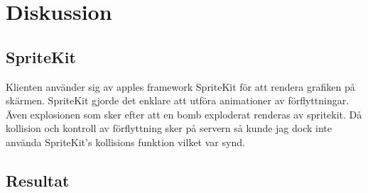 \documentclass[10pt, titlepage, oneside, a4paper]{article}
\begin{document}
    \section{Diskussion}
    	\subsection{SpriteKit}
    	
    	Klienten använder sig av apples framework SpriteKit för att rendera grafiken på skärmen. SpriteKit gjorde det enklare att utföra animationer av förflyttningar. Även explosionen som sker efter att en bomb exploderat renderas av spritekit. Då kollision och kontroll av förflyttning sker på servern så kunde jag dock inte använda SpriteKit's kollisions funktion vilket var synd. 
    	

    	
    	
    	
    	\newpage
    	\subsection{Resultat}
    	
\end{document}
